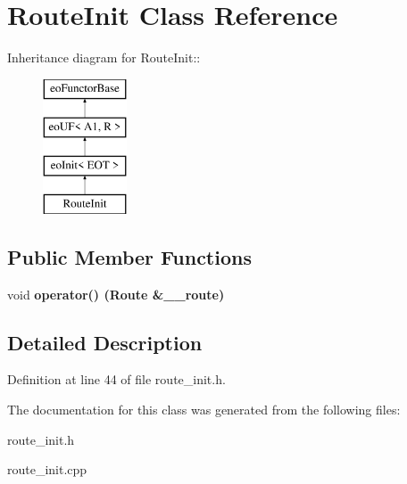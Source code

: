 \section{Route\-Init Class Reference}
\label{class_route_init}
Inheritance diagram for Route\-Init::\begin{figure}[H]
\begin{center}
\leavevmode
\includegraphics[height=4cm]{class_route_init}
\end{center}
\end{figure}
\subsection*{Public Member Functions}
\begin{CompactItemize}
\item 
void \bf{operator()} (\bf{Route} \&\_\-\_\-route)\label{class_route_init_b65a7137e114458faadb6a5510c001f7}

\end{CompactItemize}


\subsection{Detailed Description}




Definition at line 44 of file route\_\-init.h.

The documentation for this class was generated from the following files:\begin{CompactItemize}
\item 
route\_\-init.h\item 
route\_\-init.cpp\end{CompactItemize}
